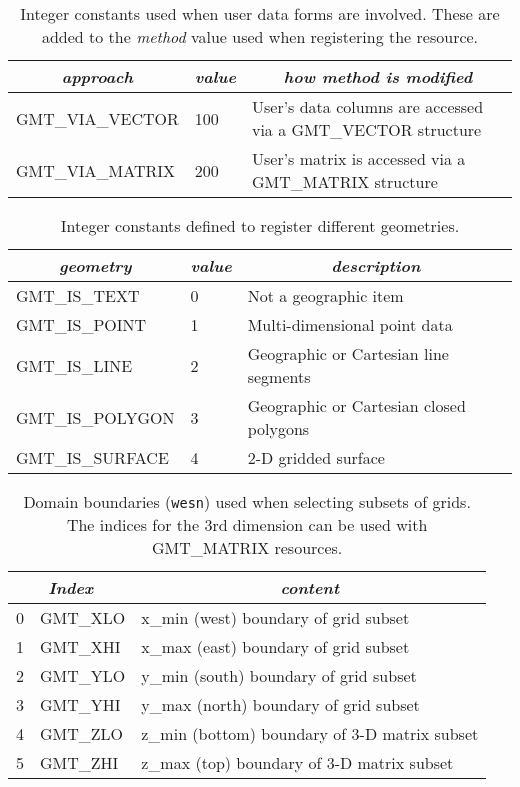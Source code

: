 \documentclass[11pt]{report}
\begin{document}
\begin{table}[h]
\small
\centering
\begin{tabular}{|l|l|l|} \hline
\multicolumn{1}{|c|}{\emph{approach}} & \multicolumn{1}{c|}{\emph{value}} & \multicolumn{1}{c|}{\emph{how method is modified}} \\ \hline
GMT\_VIA\_VECTOR	&	100	&       User's data columns are accessed via a GMT\_VECTOR structure \\ \hline
GMT\_VIA\_MATRIX	&	200	&       User's matrix is accessed via a GMT\_MATRIX structure \\ \hline
\end{tabular}
\caption{Integer constants used when user data forms are involved.  These are added
to the \emph{method} value used when registering the resource.}
\label{tbl:via}
\end{table}

\begin{table}[h]
\small
\centering
\begin{tabular}{|l|l|l|} \hline
\multicolumn{1}{|c|}{\emph{geometry}} & \multicolumn{1}{c|}{\emph{value}} & \multicolumn{1}{c|}{\emph{description}} \\ \hline
GMT\_IS\_TEXT		&	0	&       Not a geographic item \\ \hline
GMT\_IS\_POINT		&	1	&       Multi-dimensional point data \\ \hline
GMT\_IS\_LINE		&	2	&       Geographic or Cartesian line segments \\ \hline
GMT\_IS\_POLYGON	&	3	&       Geographic or Cartesian closed polygons \\ \hline
GMT\_IS\_SURFACE	&	4	&       2-D gridded surface \\ \hline
\end{tabular}
\caption{Integer constants defined to register different geometries.}
\label{tbl:geometry}
\end{table}

\begin{table}[h]
\small
\centering
\begin{tabular}{|c|l|l|} \hline
\multicolumn{2}{|c|}{\emph{Index}} & \multicolumn{1}{c|}{\emph{content}} \\ \hline
0 & GMT\_XLO	&       x\_min (west) boundary of grid subset  \\ \hline
1 & GMT\_XHI	&       x\_max (east) boundary of grid subset  \\ \hline
2 & GMT\_YLO	&       y\_min (south) boundary of grid subset  \\ \hline
3 & GMT\_YHI	&       y\_max (north) boundary of grid subset  \\ \hline
4 & GMT\_ZLO	&       z\_min (bottom) boundary of 3-D matrix subset  \\ \hline
5 & GMT\_ZHI	&       z\_max (top) boundary of 3-D matrix subset  \\ \hline
\end{tabular}
\caption{Domain boundaries (\texttt{wesn}) used when selecting subsets of grids.  The indices for
the 3rd dimension can be used with GMT\_MATRIX resources.}
\label{tbl:wesn}
\end{table}
\end{document}
